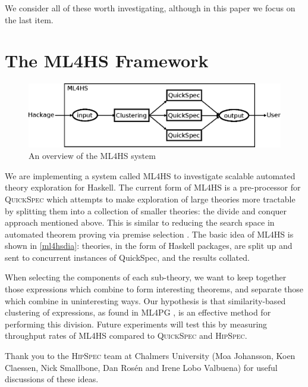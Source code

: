 \documentclass{llncs}
\begin{document}
We consider all of these worth investigating, although in this paper we
focus on the last item.

\section{The \textsc{ML4HS} Framework}\label{ml4hs}

\begin{figure}
  \centering
  \includegraphics[]{ml4hs}
  \caption{An overview of the \textsc{ML4HS} system}
  \label{ml4hsdia}
\end{figure}

We are implementing a system called \textsc{ML4HS} to investigate scalable
automated theory exploration for Haskell. The current form of \textsc{ML4HS} is
a pre-processor for \textsc{QuickSpec} which attempts to make exploration of
large theories more tractable by splitting them into a collection of smaller
theories: the divide and conquer approach mentioned above. This is
similar to reducing the search space in automated theorem proving via premise
selection \cite{kuhlwein2012overview}. The basic idea of \textsc{ML4HS} is shown
in \autoref{ml4hsdia}: theories, in the form of Haskell packages, are split up
and sent to concurrent instances of QuickSpec, and the results collated.

When selecting the components of each sub-theory, we want to keep together those
expressions which combine to form interesting theorems, and separate those which
combine in uninteresting ways. Our hypothesis is that similarity-based
clustering of expressions, as found in \textsc{ML4PG}
\cite{journals/corr/abs-1302-6421}, is an effective method for performing this
division. Future experiments will test this by measuring throughput rates of
\textsc{ML4HS} compared to \textsc{QuickSpec} and \textsc{HipSpec}.

\begin{acknowledge}
Thank you to the \textsc{HipSpec} team at Chalmers University (Moa Johansson,
Koen Claessen, Nick Smallbone, Dan Ros{\'e}n and Irene Lobo Valbuena) for useful
discussions of these ideas.
\end{acknowledge}
\end{document}

